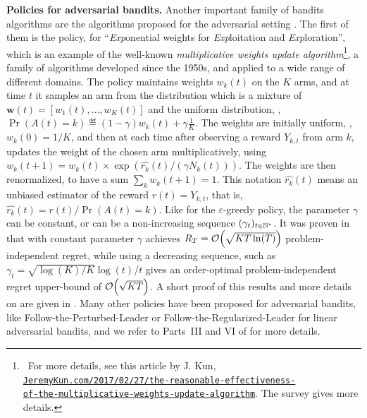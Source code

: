 \textbf{Policies for adversarial bandits.}
%
Another important family of bandits algorithms are the algorithms proposed for the adversarial setting \cite{Auer02NonStochastic}.
The first of them is the \ExpThree{} policy, for ``\emph{Exp}onential weights for \emph{Exp}loitation and \emph{Exp}loration'',
which is an example of the well-known \emph{multiplicative weights update algorithm}\footnote{~For more details, see
this article by J. Kun, \href{https://jeremykun.com/2017/02/27/the-reasonable-effectiveness-of-the-multiplicative-weights-update-algorithm/}{\texttt{JeremyKun.com/2017/02/27/the-reasonable-effectiveness-}}\\
\href{https://jeremykun.com/2017/02/27/the-reasonable-effectiveness-of-the-multiplicative-weights-update-algorithm/}{\texttt{of-the-multiplicative-weights-update-algorithm}}. The survey \cite{Arora2012multiplicative} gives more details.},
a family of algorithms developed since the 1950s, and applied to a wide range of different domains.
%
The \ExpThree{} policy maintains weights $w_k(t)$ on the $K$ arms, and at time $t$ it samples an arm from the distribution which is a mixture of $\bm{w}(t)=[w_1(t),\dots,w_K(t)]$ and the uniform distribution, \ie,
$\Pr(A(t)=k) \eqdef (1-\gamma) w_k(t) + \gamma \frac{1}{K}$.
The weights are initially uniform, \ie, $w_k(0)=1/K$, and then at each time after observing a reward $Y_{k,t}$ from arm $k$, \ExpThree{} updates the weight of the chosen arm multiplicatively, using $w_k(t+1) = w_k(t) \times \exp(\widehat{r_k}(t) / (\gamma N_k(t)))$. The weights are then renormalized, to have a sum $\sum_k w_k(t+1) = 1$.
This notation $\widehat{r_k}(t)$ means an unbiased estimator of the reward $r(t)=Y_{k,t}$, that is, $\widehat{r_k}(t) = r(t) / \Pr(A(t)=k)$.
%
Like for the $\varepsilon$-greedy policy, the parameter $\gamma$ can be constant, or can be a non-increasing sequence $(\gamma_t)_{t\in\mathbb{N}^*}$.
%
It was proven in \cite{Auer02NonStochastic} that \ExpThree{} with constant parameter $\gamma$ achieves $R_T = \mathop{}\mathopen{}\mathcal{O}\mathopen{}\left(\sqrt{K T \ln(T)}\right)$ problem-independent regret,
while using a decreasing sequence, such as $\gamma_t = \sqrt{\log(K) / K} \log(t) / t$ gives an order-optimal problem-independent regret upper-bound of $\mathop{}\mathopen{}\mathcal{O}\mathopen{}\left(\sqrt{K T}\right)$.
A short proof of this results and more details on \ExpThree{} are given in \cite{Bubeck12}.
%
Many other policies have been proposed for adversarial bandits, like Follow-the-Perturbed-Leader or Follow-the-Regularized-Leader for linear adversarial bandits,
and we refer to Parts~III and VI of \cite{LattimoreBanditAlgorithmsBook} for more details.


